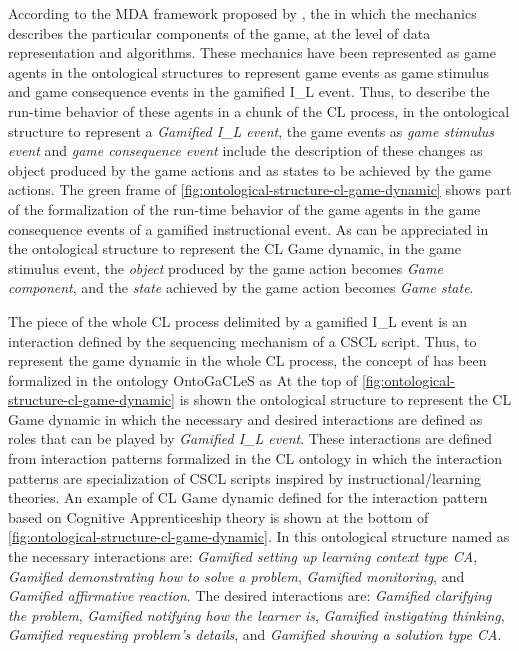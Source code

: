 According to the MDA framework proposed by , the  in which the mechanics describes the particular components of the game, at the level of data representation and algorithms. These mechanics have been represented as game agents in the ontological structures to represent game events as game stimulus and game consequence events in the gamified I\_L event. Thus, to describe the run-time behavior of these agents in a chunk of the CL process, in the ontological structure to represent a \emph{Gamified I\_L event}, the game events as \emph{game stimulus event} and \emph{game consequence event} include the description of these changes as object produced by the game actions and as states to be achieved by the game actions. The green frame of \autoref{fig:ontological-structure-cl-game-dynamic} shows part of the formalization of the run-time behavior of the game agents in the game consequence events of a gamified instructional event. As can be appreciated in the ontological structure to represent the CL Game dynamic, in the game stimulus event, the \emph{object} produced by the game action becomes \emph{Game component}, and the \emph{state} achieved by the game action becomes \emph{Game state}.

The piece of the whole CL process delimited by a gamified I\_L event is an interaction defined by the sequencing mechanism of a CSCL script. Thus, to represent the game dynamic in the whole CL process, the concept of  has been formalized in the ontology OntoGaCLeS as  At the top of \autoref{fig:ontological-structure-cl-game-dynamic} is shown the ontological structure to represent the CL Game dynamic in which the necessary and desired interactions are defined as roles that can be played by \emph{Gamified I\_L event}. These interactions are defined from interaction patterns formalized in the CL ontology in which the interaction patterns are specialization of CSCL scripts inspired by instructional/learning theories. An example of CL Game dynamic defined for the interaction pattern based on Cognitive Apprenticeship theory is shown at the bottom of \autoref{fig:ontological-structure-cl-game-dynamic}. In this ontological structure named as  the necessary interactions are: \emph{Gamified setting up learning context type CA}, \emph{Gamified demonstrating how to solve a problem}, \emph{Gamified monitoring}, and \emph{Gamified affirmative reaction}. The desired interactions are: \emph{Gamified clarifying the problem}, \emph{Gamified notifying how the learner is}, \emph{Gamified instigating thinking}, \emph{Gamified requesting problem's details}, and \emph{Gamified showing a solution type CA}.

